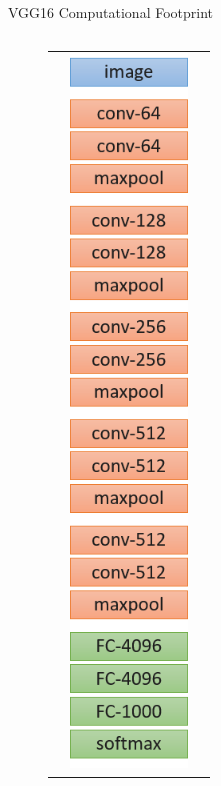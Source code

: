 \documentclass[aspectratio=169]{beamer}
\begin{document}
\begin{frame}{VGG16 Computational Footprint}
\vspace{-0.5cm}
\begin{columns}
	\begin{column}{0.1\textwidth}
		\begin{figure}
			\begin{tabular}{c}
				\includegraphics[width=0.8\textwidth]{img/cnn/vgg16_architecture.png}

\end{tabular}
\end{figure}
\end{column}
\end{columns}
\end{frame}
\end{document}
